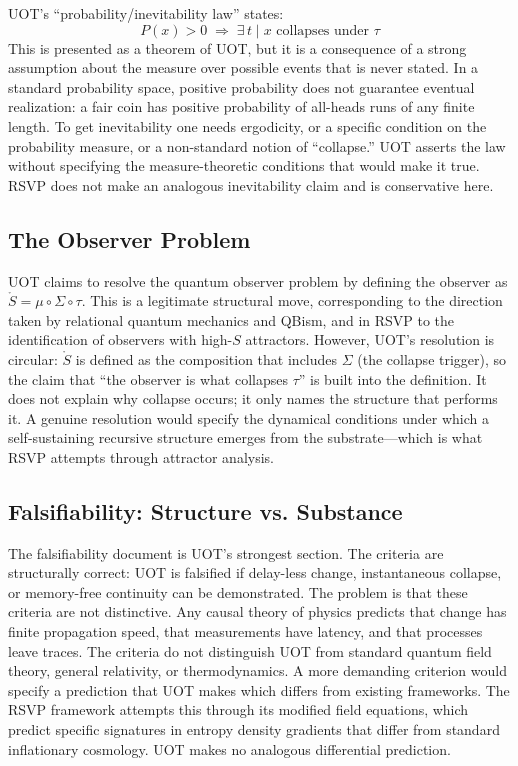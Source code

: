 \documentclass[12pt, oneside]{article}
\theoremstyle{plain-remark}
\newcommand{\utau}{\tau}
\newcommand{\uSigma}{\Sigma}
\newcommand{\umu}{\mu}
\newcommand{\uS}{\mathring{S}}
\newcommand{\Sf}{S}
\begin{document}
UOT's ``probability/inevitability law'' states:
\[
P(x) > 0 \;\Rightarrow\; \exists\, t \;|\; x \text{ collapses under } \utau
\]
This is presented as a theorem of UOT, but it is a consequence of a strong assumption
about the measure over possible events that is never stated. In a standard probability
space, positive probability does not guarantee eventual realization: a fair coin has
positive probability of all-heads runs of any finite length. To get inevitability one
needs ergodicity, or a specific condition on the probability measure, or a non-standard
notion of ``collapse.'' UOT asserts the law without specifying the measure-theoretic
conditions that would make it true. RSVP does not make an analogous inevitability claim
and is conservative here.

\subsection{The Observer Problem}

UOT claims to resolve the quantum observer problem by defining the observer as $\uS =
\umu \circ \uSigma \circ \utau$. This is a legitimate structural move, corresponding to
the direction taken by relational quantum mechanics and QBism, and in RSVP to the
identification of observers with high-$\Sf$ attractors. However, UOT's resolution is
circular: $\uS$ is defined as the composition that includes $\uSigma$ (the collapse
trigger), so the claim that ``the observer is what collapses $\utau$'' is built into
the definition. It does not explain why collapse occurs; it only names the structure
that performs it. A genuine resolution would specify the dynamical conditions under
which a self-sustaining recursive structure emerges from the substrate---which is what
RSVP attempts through attractor analysis.

\subsection{Falsifiability: Structure vs. Substance}

The falsifiability document is UOT's strongest section. The criteria are structurally
correct: UOT is falsified if delay-less change, instantaneous collapse, or memory-free
continuity can be demonstrated. The problem is that these criteria are not distinctive.
Any causal theory of physics predicts that change has finite propagation speed, that
measurements have latency, and that processes leave traces. The criteria do not distinguish
UOT from standard quantum field theory, general relativity, or thermodynamics. A more
demanding criterion would specify a prediction that UOT makes which differs from existing
frameworks. The RSVP framework attempts this through its modified field equations, which
predict specific signatures in entropy density gradients that differ from standard
inflationary cosmology. UOT makes no analogous differential prediction.
\end{document}
